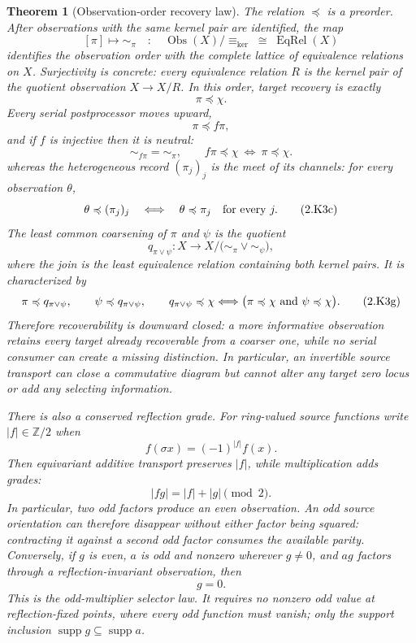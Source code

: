 \documentclass[11pt]{article}
\newtheorem{theorem}{Theorem}[section]
\theoremstyle{definition}
\theoremstyle{remark}
\begin{document}
\begin{theorem}[Observation-order recovery law]
The relation \(\preccurlyeq\) is a preorder.  After observations with the
same kernel pair are identified, the map
\[
 [\pi]\longmapsto{\sim_\pi}
 \quad:\quad
 \operatorname{Obs}(X)/{\equiv_{\ker}}
       \;\cong\;\operatorname{EqRel}(X)
\tag{2.K3e}\label{eq:observation-complete-lattice}
\]
identifies the observation order with the complete lattice of equivalence
relations on \(X\).  Surjectivity is concrete: every equivalence relation
\(R\) is the kernel pair of the quotient observation \(X\to X/R\).
In this order, target recovery is exactly
\[
                         \pi\preccurlyeq\chi.
\tag{2.K3a}\label{eq:recovery-is-order}
\]
Every serial postprocessor moves upward,
\[
                         \pi\preccurlyeq f\pi,
\tag{2.K3b}\label{eq:serial-order}
\]
and if \(f\) is injective then it is neutral:
\[
       {\sim_{f\pi}}={\sim_\pi},\qquad
       f\pi\preccurlyeq\chi\ \Longleftrightarrow\
       \pi\preccurlyeq\chi .
\tag{2.K3d}\label{eq:injective-transport-neutrality}
\]
whereas the heterogeneous record \((\pi_j)_j\) is the meet of its channels:
for every observation \(\theta\),
\[
 \theta\preccurlyeq(\pi_j)_j
 \quad\Longleftrightarrow\quad
 \theta\preccurlyeq\pi_j\quad\hbox{for every }j.
\tag{2.K3c}\label{eq:parallel-meet}
\]
The least common coarsening of \(\pi\) and \(\psi\) is the quotient
\[
 q_{\pi\vee\psi}:X\longrightarrow
 X/\bigl({\sim_\pi}\vee{\sim_\psi}\bigr),
\tag{2.K3f}\label{eq:observation-join}
\]
where the join is the least equivalence relation containing both kernel
pairs.  It is characterized by
\[
 \pi\preccurlyeq q_{\pi\vee\psi},\qquad
 \psi\preccurlyeq q_{\pi\vee\psi},\qquad
 q_{\pi\vee\psi}\preccurlyeq\chi
 \Longleftrightarrow
 \bigl(\pi\preccurlyeq\chi\ \hbox{and}\ \psi\preccurlyeq\chi\bigr).
\tag{2.K3g}\label{eq:observation-join-law}
\]
Therefore recoverability is downward closed: a more informative observation
retains every target already recoverable from a coarser one, while no serial
consumer can create a missing distinction.  In particular, an invertible
source transport can close a commutative diagram but cannot alter any target
zero locus or add any selecting information.

There is also a conserved reflection grade.  For ring-valued source
functions write \(|f|\in\mathbb Z/2\) when
\[
                 f(\sigma x)=(-1)^{|f|}f(x).
\]
Then equivariant additive transport preserves \(|f|\), while multiplication
adds grades:
\[
                  |fg|=|f|+|g|\pmod 2.
\tag{2.K4a}\label{eq:reflection-grade-product}
\]
In particular, two odd factors produce an even observation.  An odd source
orientation can therefore disappear without either factor being squared:
contracting it against a second odd factor consumes the available parity.
Conversely, if \(g\) is even, \(a\) is odd and nonzero wherever \(g\ne0\),
and \(ag\) factors through a reflection-invariant observation, then
\[
                         g=0.
\tag{2.K4b}\label{eq:odd-multiplier-selector}
\]
This is the odd-multiplier selector law.  It requires no nonzero odd value at
reflection-fixed points, where every odd function must vanish; only the
support inclusion \(\operatorname{supp}g\subseteq\operatorname{supp}a\).


\end{theorem}
\end{document}
